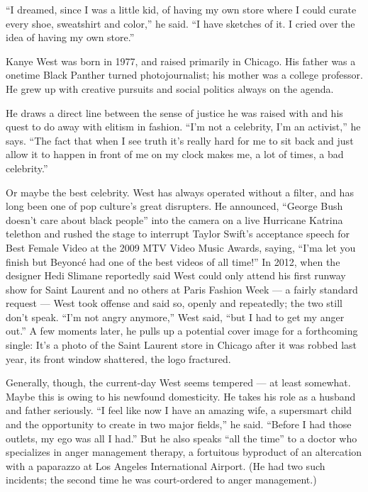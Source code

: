 ``I dreamed, since I was a little kid, of having my own store where I
could curate every shoe, sweatshirt and color,'' he said. ``I have
sketches of it. I cried over the idea of having my own store.''

Kanye West was born in 1977, and raised primarily in Chicago. His father
was a onetime Black Panther turned photojournalist; his mother was a
college professor. He grew up with creative pursuits and social politics
always on the agenda.

He draws a direct line between the sense of justice he was raised with
and his quest to do away with elitism in fashion. ``I'm not a celebrity,
I'm an activist,'' he says. ``The fact that when I see truth it's really
hard for me to sit back and just allow it to happen in front of me on my
clock makes me, a lot of times, a bad celebrity.''

Or maybe the best celebrity. West has always operated without a filter,
and has long been one of pop culture's great disrupters. He announced,
``George Bush doesn't care about black people'' into the camera on a
live Hurricane Katrina telethon and rushed the stage to interrupt Taylor
Swift's acceptance speech for Best Female Video at the 2009 MTV Video
Music Awards, saying, ``I'ma let you finish but Beyoncé had one of the
best videos of all time!'' In 2012, when the designer Hedi Slimane
reportedly said West could only attend his first runway show for Saint
Laurent and no others at Paris Fashion Week --- a fairly standard
request --- West took offense and said so, openly and repeatedly; the
two still don't speak. ``I'm not angry anymore,'' West said, ``but I had
to get my anger out.'' A few moments later, he pulls up a potential
cover image for a forthcoming single: It's a photo of the Saint Laurent
store in Chicago after it was robbed last year, its front window
shattered, the logo fractured.

Generally, though, the current-day West seems tempered --- at least
somewhat. Maybe this is owing to his newfound domesticity. He takes his
role as a husband and father seriously. ``I feel like now I have an
amazing wife, a supersmart child and the opportunity to create in two
major fields,'' he said. ``Before I had those outlets, my ego was all I
had.'' But he also speaks ``all the time'' to a doctor who specializes
in anger management therapy, a fortuitous byproduct of an altercation
with a paparazzo at Los Angeles International Airport. (He had two such
incidents; the second time he was court-ordered to anger management.)

